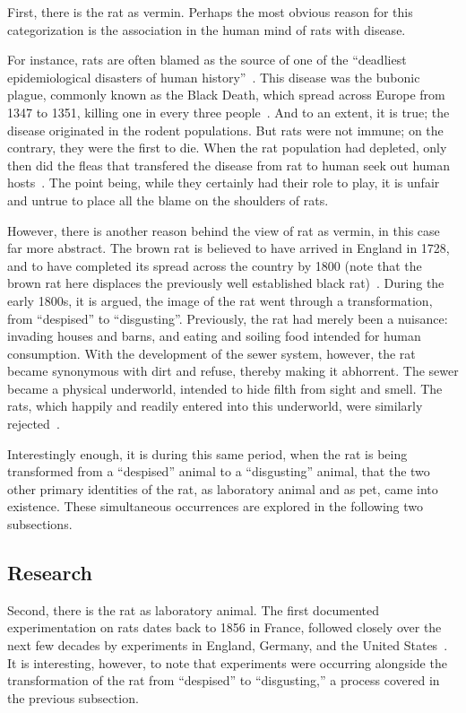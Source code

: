 \documentclass[12pt]{article}
\begin{document}
First, there is the rat as vermin. Perhaps the most obvious reason for this categorization is the association in the human mind of rats with disease.

For instance, rats are often blamed as the source of one of the ``deadliest epidemiological disasters of human history''~\cite{ONeill}. This disease was the bubonic plague, commonly known as the Black Death, which spread across Europe from 1347 to 1351, killing one in every three people~\cite{Gottfried1983}. And to an extent, it is true; the disease originated in the rodent populations. But rats were not immune; on the contrary, they were the first to die. When the rat population had depleted, only then did the fleas that transfered the disease from rat to human seek out human hosts~\cite{Marrin2006, ONeill}. The point being, while they certainly had their role to play, it is unfair and untrue to place all the blame on the shoulders of rats.

However, there is another reason behind the view of rat as vermin, in this case far more abstract. The brown rat is believed to have arrived in England in 1728, and to have completed its spread across the country by 1800 (note that the brown rat here displaces the previously well established black rat)~\cite{Edelman2002}. During the early 1800s, it is argued, the image of the rat went through a transformation, from ``despised'' to ``disgusting''. Previously, the rat had merely been a nuisance: invading houses and barns, and eating and soiling food intended for human consumption. With the development of the sewer system, however, the rat became synonymous with dirt and refuse, thereby making it abhorrent. The sewer became a physical underworld, intended to hide filth from sight and smell. The rats, which happily and readily entered into this underworld, were similarly rejected~\cite{Edelman2005}.

Interestingly enough, it is during this same period, when the rat is being transformed from a ``despised'' animal to a ``disgusting'' animal, that the two other primary identities of the rat, as laboratory animal and as pet, came into existence. These simultaneous occurrences are explored in the following two subsections.

\subsection{Research} \label{Research}

Second, there is the rat as laboratory animal. The first documented experimentation on rats dates back to 1856 in France, followed closely over the next few decades by experiments in England, Germany, and the United States~\cite{Edelman2002}. It is interesting, however, to note that experiments were occurring alongside the transformation of the rat from ``despised'' to ``disgusting,'' a process covered in the previous subsection.
\end{document}
